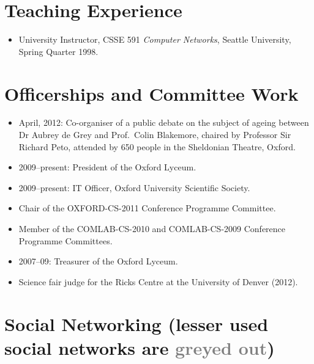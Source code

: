 \documentclass[letterpaper]{article}
\begin{document}
\section*{Teaching Experience}

\begin{itemize}
    \item University Instructor, CSSE 591 \emph{Computer Networks},
    Seattle University, Spring Quarter 1998.
\end{itemize}

\section*{Officerships and Committee Work}
\begin{itemize}
	\item April, 2012: Co-organiser of a public debate on the subject of ageing between
		Dr Aubrey de Grey and Prof.\ Colin Blakemore, chaired by Professor Sir Richard Peto,
		attended by 650 people in the Sheldonian Theatre, Oxford.
	\item 2009--present: President of the Oxford Lyceum.
	\item 2009--present: IT Officer, Oxford University Scientific Society.
	\item Chair of the OXFORD-CS-2011 Conference Programme Committee.
	\item Member of the COMLAB-CS-2010 and COMLAB-CS-2009 Conference Programme Committees.
	\item 2007--09: Treasurer of the Oxford Lyceum.
	\item Science fair judge for the Ricks Centre at the University of Denver (2012).
\end{itemize}


\section*{Social Networking {\small (lesser used social networks are \textcolor{grey}{greyed out})}}


\end{document}
